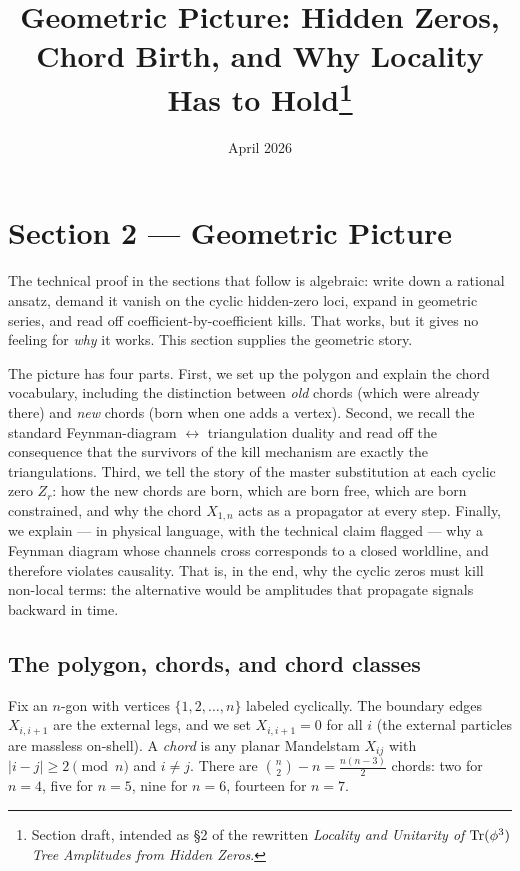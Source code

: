 \documentclass[11pt]{article}
\title{Geometric Picture: Hidden Zeros, Chord Birth, and Why Locality Has to Hold\thanks{Section draft, intended as \S2 of the rewritten \emph{Locality and Unitarity of $\mathrm{Tr}(\phi^3)$ Tree Amplitudes from Hidden Zeros}.}}
\date{April 2026}
\theoremstyle{definition}
\begin{document}
\maketitle

\section*{Section 2 --- Geometric Picture}
\setcounter{section}{2}
\renewcommand{\thesection}{\arabic{section}}
\renewcommand{\thesubsection}{\thesection.\arabic{subsection}}

\noindent
The technical proof in the sections that follow is algebraic: write down a rational ansatz, demand it vanish on the cyclic hidden-zero loci, expand in geometric series, and read off coefficient-by-coefficient kills. That works, but it gives no feeling for \emph{why} it works. This section supplies the geometric story.

The picture has four parts. First, we set up the polygon and explain the chord vocabulary, including the distinction between \emph{old} chords (which were already there) and \emph{new} chords (born when one adds a vertex). Second, we recall the standard Feynman-diagram $\leftrightarrow$ triangulation duality and read off the consequence that the survivors of the kill mechanism are exactly the triangulations. Third, we tell the story of the master substitution at each cyclic zero $Z_r$: how the new chords are born, which are born free, which are born constrained, and why the chord $X_{1,n}$ acts as a propagator at every step. Finally, we explain --- in physical language, with the technical claim flagged --- why a Feynman diagram whose channels cross corresponds to a closed worldline, and therefore violates causality. That is, in the end, why the cyclic zeros must kill non-local terms: the alternative would be amplitudes that propagate signals backward in time.

\subsection{The polygon, chords, and chord classes}

Fix an $n$-gon with vertices $\{1,2,\dots,n\}$ labeled cyclically. The boundary edges $X_{i,i+1}$ are the external legs, and we set $X_{i,i+1} = 0$ for all $i$ (the external particles are massless on-shell). A \emph{chord} is any planar Mandelstam $X_{ij}$ with $|i-j| \geq 2 \pmod n$ and $i \neq j$. There are $\binom{n}{2} - n = \frac{n(n-3)}{2}$ chords:
two for $n=4$, five for $n=5$, nine for $n=6$, fourteen for $n=7$.
\end{document}
